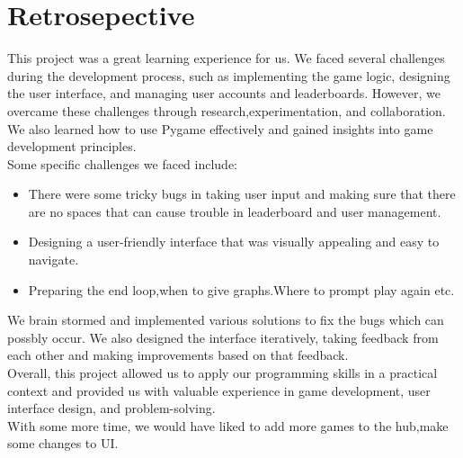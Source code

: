 \documentclass[12pt]{article}
\begin{document}
\section{Retrosepective}
    This project was a great learning experience for us.
    We faced several challenges during the development process,
    such as implementing the game logic, designing the user interface,
    and managing user accounts and leaderboards. However,
    we overcame these challenges through research,experimentation,
    and collaboration. We also learned how to use Pygame effectively and gained insights into game development principles.\\
    Some specific challenges we faced include:\\
    \begin{itemize}
        \item There were some tricky bugs in taking user input and making sure that there are no spaces that can cause trouble in leaderboard and user management.
        \item Designing a user-friendly interface that was visually appealing and easy to navigate.
        \item Preparing the end loop,when to give graphs.Where to prompt play again etc.
    \end{itemize}
    We brain stormed and implemented various solutions to fix the bugs which can possbly occur.
    We also designed the interface iteratively, taking feedback from each other and making improvements based on that feedback.\\
    Overall, this project allowed us to apply our programming skills in a practical context and provided us with valuable experience in game development, user interface design, and problem-solving.\\
    With some more time, we would have liked to add more games to the hub,make some changes to UI.
    \cite{maze_github}
    \cite{sha256_bash}
    \cite{python_inheritance}
    \cite{othello_rules}
    \cite{pygame_official}
    \printbibliography
\end{document}
